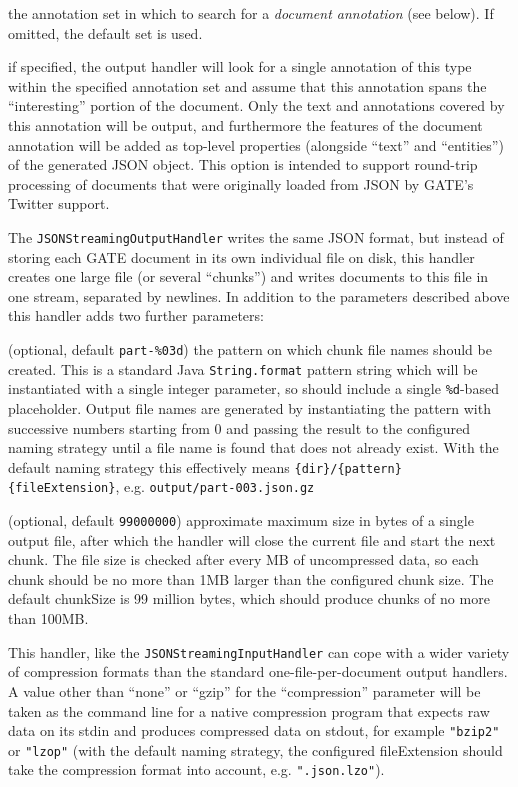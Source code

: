 \item[documentAnnotationASName] the annotation set in which to search for a
  \emph{document annotation} (see below).  If omitted, the default set is used.
\item[documentAnnotationType] if specified, the output handler will look for a
  single annotation of this type within the specified annotation set and assume
  that this annotation spans the ``interesting'' portion of the document.  Only
  the text and annotations covered by this annotation will be output, and
  furthermore the features of the document annotation will be added as
  top-level properties (alongside ``text'' and ``entities'') of the generated
  JSON object.  This option is intended to support round-trip processing of
  documents that were originally loaded from JSON by GATE's Twitter support.
\ede

The \verb!JSONStreamingOutputHandler! writes the same JSON format, but instead
of storing each GATE document in its own individual file on disk, this handler
creates one large file (or several ``chunks'') and writes documents to this
file in one stream, separated by newlines.  In addition to the parameters
described above this handler adds two further parameters:

\bde
\item[pattern] (optional, default \verb!part-%03d!) the pattern on which chunk
  file names should be created.  This is a standard Java \verb!String.format!
  pattern string which will be instantiated with a single integer parameter, so
  should include a single \verb!%d!-based placeholder.  Output file names are
  generated by instantiating the pattern with successive numbers starting from
  0 and passing the result to the configured naming strategy until a file name
  is found that does not already exist.  With the default naming strategy this
  effectively means \verb!{dir}/{pattern}{fileExtension}!, e.g.
  \verb!output/part-003.json.gz!
\item[chunkSize] (optional, default \verb!99000000!) approximate maximum size
  in bytes of a single output file, after which the handler will close the
  current file and start the next chunk.  The file size is checked after every MB
  of uncompressed data, so each chunk should be no more than 1MB larger than the
  configured chunk size.  The default chunkSize is 99 million bytes, which
  should produce chunks of no more than 100MB.
\ede

This handler, like the \verb!JSONStreamingInputHandler! can cope with a wider
variety of compression formats than the standard one-file-per-document output
handlers.  A value other than ``none'' or ``gzip'' for the ``compression''
parameter will be taken as the command line for a native compression program
that expects raw data on its stdin and produces compressed data on stdout, for
example \verb!"bzip2"! or \verb!"lzop"! (with the default naming strategy, the
configured fileExtension should take the compression format into account, e.g.
\verb!".json.lzo"!).

